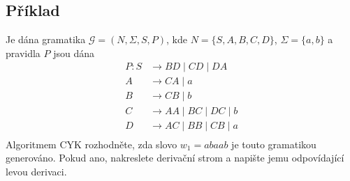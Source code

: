 \subsection{Příklad}
Je dána gramatika $\mathcal{G} = (N, \Sigma, S, P)$, kde $N = \{S,A,B,C,D\}$, $\Sigma = \{a,b\}$ a pravidla $P$ jsou dána
\begin{align*}
  P:  S & \rightarrow BD \mid CD \mid DA \\
    A & \rightarrow CA \mid a \\
    B & \rightarrow CB \mid b \\ 
    C & \rightarrow AA \mid BC \mid DC \mid b \\
    D & \rightarrow AC \mid BB \mid CB \mid a \\
\end{align*}
Algoritmem CYK rozhodněte, zda slovo $w_1 = abaab$ je touto gramatikou generováno. Pokud ano, nakreslete derivační strom a napište jemu odpovídající levou derivaci.